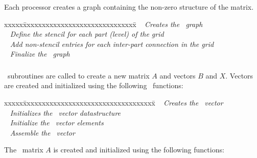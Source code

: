 \documentclass[10pt]{article}
\begin{document}
\subsubsection{}


 Each processor creates a graph containing the non-zero structure of
 the matrix.

\begin{tabbing}
xxxxx\=xxxxxxxxxxxxxxxxxxxxxxxxxxxxxx\=\kill
\> \done\ 
   \> \textit{Creates the \hypre\ graph} \\
\> \done\ 
   \> \textit{Define the stencil for each part (level) of the grid} \\
\> \done\ 
   \> \textit{Add non-stencil entries for each inter-part connection in the grid} \\
\> \done\ 
   \> \textit{Finalize the \hypre\ graph}
\end{tabbing}

\subsubsection{}


\hypre\ subroutines are called to create
a new matrix $A$ and vectors $B$ and $X$.  Vectors are
created and initialized using the following \hypre\ functions:

\begin{tabbing}
xxxxx\=xxxxxxxxxxxxxxxxxxxxxxxxxxxxxxxxxxx\=\kill
\> \done\ 
   \> \textit{Creates the \hypre\ vector} \\
\> \done\ 
   \> \textit{Initializes the \hypre\ vector datastructure} \\
\> \done\ 
   \> \textit{Initialize the \hypre\ vector elements} \\
\> \done\ 
   \> \textit{Assemble the \hypre\ vector}
\end{tabbing}

The \hypre\ matrix $A$ is created and initialized
using the following functions:
\end{document}
